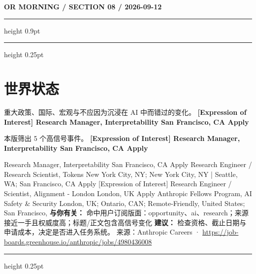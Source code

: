 \documentclass[10.5pt]{ctexart}
\begin{document}
\newpage
{\small\bfseries OR MORNING / SECTION 08 / 2026-09-12}
\vspace{2mm}
\hrule height 0.9pt
\vspace{1.5mm}
\hrule height 0.25pt
\vspace{4mm}
\section*{世界状态}
{\color{ormuted} 重大政策、国际、宏观与不应因为沉浸在 AI 中而错过的变化。}
\vspace{2mm}
{\LARGE\bfseries [Expression of Interest] Research Manager, Interpretability San Francisco, CA Apply}\par
\vspace{1mm}
{\color{ormuted} 本版筛出 5 个高信号事件。}
\vspace{3mm}
{\Large\bfseries [Expression of Interest] Research Manager, Interpretability San Francisco, CA Apply}\par
[Expression of Interest] Research Manager, Interpretability San Francisco, CA Apply Research Engineer / Research Scientist, Tokens New York City, NY; New York City, NY | Seattle, WA; San Francisco, CA Apply [Expression of Interest] Research Engineer / Scientist, Alignment - London London, UK Apply Anthropic Fellows Program, AI Safety \& Security London, UK; Ontario, CAN; Remote-Friendly, United States; San Francisco, 
\textbf{与你有关：} 命中用户订阅版面：opportunity、ai、research；来源接近一手且权威度高；标题/正文包含高信号变化
\textbf{建议：} 检查资格、截止日期与申请成本，决定是否进入任务系统。
{\footnotesize\color{ormuted} 来源：Anthropic Careers · \url{https://job-boards.greenhouse.io/anthropic/jobs/4980436008}}
\vspace{4mm}
\hrule height 0.25pt
\vspace{3mm}
\end{document}
